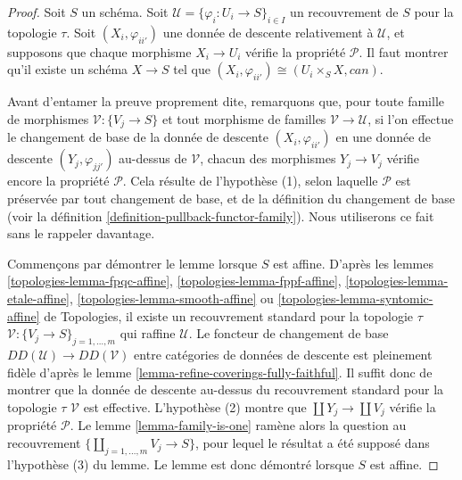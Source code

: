 \begin{proof}
Soit $S$ un schéma. Soit
$\mathcal{U} = \{\varphi_i : U_i \to S\}_{i \in I}$ un recouvrement de $S$
pour la topologie $\tau$. Soit $(X_i, \varphi_{ii'})$ une donnée de descente relativement
à $\mathcal{U}$, et supposons que chaque morphisme $X_i \to U_i$ vérifie la
propriété $\mathcal{P}$. Il faut montrer qu'il existe un schéma $X \to S$ tel
que $(X_i, \varphi_{ii'}) \cong (U_i \times_S X, can)$.

\medskip\noindent
Avant d'entamer la preuve proprement dite, remarquons que, pour toute famille
de morphismes $\mathcal{V} : \{V_j \to S\}$ et tout morphisme de familles
$\mathcal{V} \to \mathcal{U}$, si l'on effectue le changement de base de la
donnée de descente $(X_i, \varphi_{ii'})$ en une donnée de descente
$(Y_j, \varphi_{jj'})$ au-dessus de $\mathcal{V}$, chacun des morphismes
$Y_j \to V_j$ vérifie encore la propriété $\mathcal{P}$. Cela résulte de
l'hypothèse (1), selon laquelle $\mathcal{P}$ est préservée par tout changement
de base, et de la définition du changement de base (voir la
définition \ref{definition-pullback-functor-family}). Nous utiliserons ce fait
sans le rappeler davantage.

\medskip\noindent
Commençons par démontrer le lemme lorsque $S$ est affine. D'après les lemmes
\ref{topologies-lemma-fpqc-affine},
\ref{topologies-lemma-fppf-affine},
\ref{topologies-lemma-etale-affine},
\ref{topologies-lemma-smooth-affine} ou
\ref{topologies-lemma-syntomic-affine} de Topologies, il existe un recouvrement
standard pour la topologie $\tau$
$\mathcal{V} : \{V_j \to S\}_{j = 1, \ldots, m}$ qui raffine
$\mathcal{U}$. Le foncteur de changement de base
$DD(\mathcal{U}) \to DD(\mathcal{V})$ entre catégories de données de descente
est pleinement fidèle d'après le
lemme \ref{lemma-refine-coverings-fully-faithful}. Il suffit donc de montrer
que la donnée de descente au-dessus du recouvrement standard pour la topologie $\tau$
$\mathcal{V}$ est effective. L'hypothèse (2) montre que
$\coprod Y_j \to \coprod V_j$ vérifie la propriété $\mathcal{P}$. Le
lemme \ref{lemma-family-is-one} ramène alors la question au recouvrement
$\{\coprod_{j = 1, \ldots, m} V_j \to S\}$, pour lequel le résultat a été
supposé dans l'hypothèse (3) du lemme. Le lemme est donc démontré lorsque $S$
est affine.


\end{proof}
